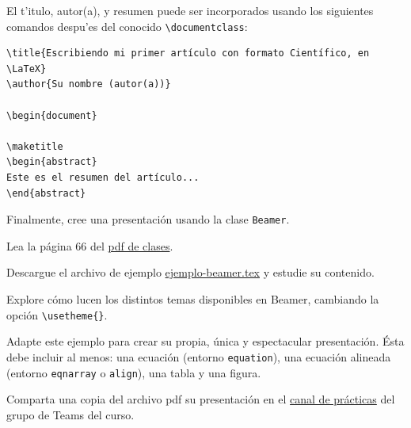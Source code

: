 \documentclass[11pt]{exam}
\begin{document}
\begin{questions}
El t'itulo, autor(a), y resumen puede ser incorporados usando los siguientes comandos despu'es del conocido \verb|\documentclass|:

\begin{verbatim}
\title{Escribiendo mi primer artículo con formato Científico, en \LaTeX}
\author{Su nombre (autor(a))}

\begin{document}

\maketitle
\begin{abstract}
Este es el resumen del artículo...
\end{abstract}
\end{verbatim}

\item Finalmente, cree una presentación usando la clase \texttt{Beamer}.
\begin{parts}
\item Lea la página 66 del \href{https://udec.instructure.com/courses/29314/pages/latex-pdf-presentacion?module_item_id=1039048}{pdf de clases}.
\item Descargue el archivo de ejemplo \href{https://github.com/gfrubi/CC/blob/master/guias/06/ejemplo-beamer.tex}{ejemplo-beamer.tex} y estudie su contenido.
\item Explore cómo lucen los distintos temas disponibles en Beamer, cambiando la opción \verb|\usetheme{}|.
\item Adapte este ejemplo para crear su propia, única y espectacular presentación. Ésta debe incluir al menos: una ecuación (entorno \texttt{equation}), una ecuación alineada (entorno \texttt{eqnarray} o \texttt{align}), una tabla y una figura.
\item Comparta una copia del archivo pdf su presentación en el \href{https://teams.microsoft.com/l/channel/19\%3a39b89cfa8e2d4deaa611d18190ed6c9d\%40thread.tacv2/02\%2520Pr\%25C3\%25A1cticas?groupId=787ade39-1121-4cac-99ae-cc187b6e6587&tenantId=56582b9e-8824-49d0-a665-cd328c0e004a}{canal de prácticas} del grupo de Teams del curso.
\end{parts}
\end{questions}
\end{document}
